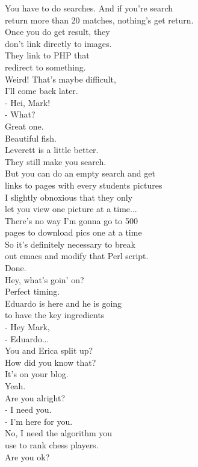 \documentclass{article}
\begin{document}
\begin{multicols}{3}
You have to do searches. And if you're search\\
return more than 20 matches, nothing's get return.\\
Once you do get result, they\\
don't link directly to images.\\
They link to PHP that\\
redirect to something.\\
Weird! That's maybe difficult,\\
I'll come back later.\\
- Hei, Mark!\\
- What?\\
Great one.\\
Beautiful fish.\\
Leverett is a little better.\\
They still make you search.\\
But you can do an empty search and get\\
links to pages with every students pictures\\
I slightly obnoxious that they only\\
let you view one picture at a time...\\
There's no way I'm gonna go to 500\\
pages to download pics one at a time\\
So it's definitely necessary to break\\
out emacs and modify that Perl script.\\
Done.\\
Hey, what's goin' on?\\
Perfect timing.\\
Eduardo is here and he is going\\
to have the key ingredients\\
- Hey Mark,\\
- Eduardo...\\
You and Erica split up?\\
How did you know that?\\
It's on your blog.\\
Yeah.\\
Are you alright?\\
- I need you.\\
- I'm here for you.\\
No, I need the algorithm you\\
use to rank chess players.\\
Are you ok?\\

\end{multicols}
\end{document}
